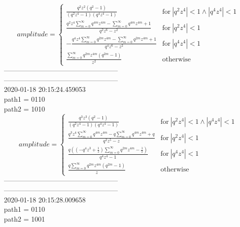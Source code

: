 \documentclass{jsreport}
\begin{document}
$$amplitude = \begin{cases} \frac{q^{2} z^{2} \left(q^{2} - 1\right)}{\left(q^{2} z^{4} - 1\right) \left(q^{4} z^{4} - 1\right)} & \text{for}\: \left|{q^{2} z^{4}}\right| < 1 \wedge \left|{q^{4} z^{4}}\right| < 1 \\\frac{q^{2} z^{4} \sum_{m=0}^{\infty} q^{4 m} z^{4 m} - \sum_{m=0}^{\infty} q^{4 m} z^{4 m} + 1}{q^{2} z^{6} - z^{2}} & \text{for}\: \left|{q^{2} z^{4}}\right| < 1 \\- \frac{q^{4} z^{4} \sum_{m=0}^{\infty} q^{2 m} z^{4 m} - \sum_{m=0}^{\infty} q^{2 m} z^{4 m} + 1}{q^{4} z^{6} - z^{2}} & \text{for}\: \left|{q^{4} z^{4}}\right| < 1 \\\frac{\sum_{m=0}^{\infty} q^{2 m} z^{4 m} \left(q^{2 m} - 1\right)}{z^{2}} & \text{otherwise} \end{cases}$$
--------------------------------------------------\\
--------------------------------------------------\\
2020-01-18 20:15:24.459053\\
path1 = 0110\\
path2 = 1010\\
$$amplitude = \begin{cases} \frac{q^{3} z^{3} \left(q^{2} - 1\right)}{\left(q^{2} z^{4} - 1\right) \left(q^{4} z^{4} - 1\right)} & \text{for}\: \left|{q^{2} z^{4}}\right| < 1 \wedge \left|{q^{4} z^{4}}\right| < 1 \\\frac{q^{3} z^{4} \sum_{m=0}^{\infty} q^{4 m} z^{4 m} - q \sum_{m=0}^{\infty} q^{4 m} z^{4 m} + q}{q^{2} z^{5} - z} & \text{for}\: \left|{q^{2} z^{4}}\right| < 1 \\\frac{q \left(\left(- q^{4} z^{3} + \frac{1}{z}\right) \sum_{m=0}^{\infty} q^{2 m} z^{4 m} - \frac{1}{z}\right)}{q^{4} z^{4} - 1} & \text{for}\: \left|{q^{4} z^{4}}\right| < 1 \\\frac{q \sum_{m=0}^{\infty} q^{2 m} z^{4 m} \left(q^{2 m} - 1\right)}{z} & \text{otherwise} \end{cases}$$
--------------------------------------------------\\
--------------------------------------------------\\
2020-01-18 20:15:28.009658\\
path1 = 0110\\
path2 = 1001\\
\end{document}
